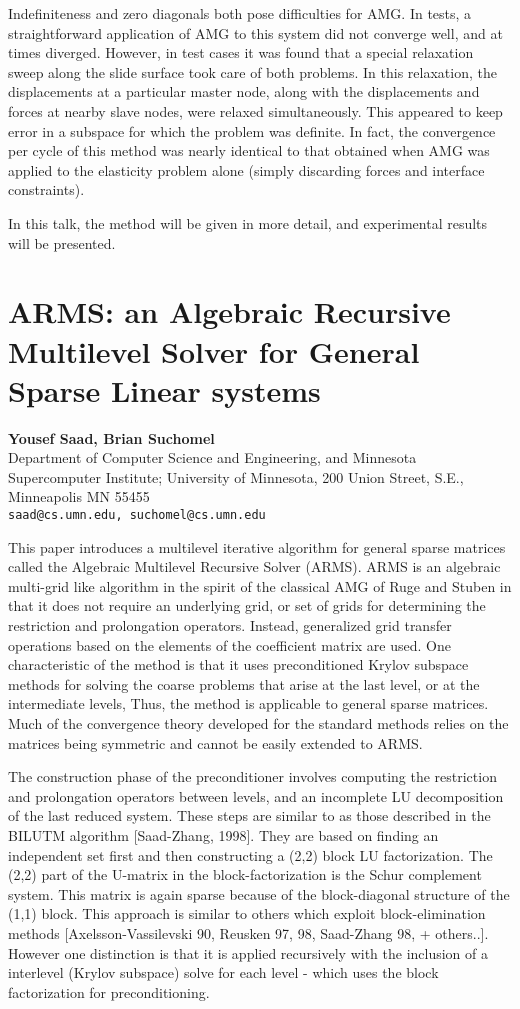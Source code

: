 \documentclass[11pt]{article}
\newcommand{\nextab}[4]{
	\section{#2}
	{\bf #1} \\ \nopagebreak
	{#3} \\ \nopagebreak
	{\tt #4} \nopagebreak
	}
\begin{document}
Indefiniteness and zero diagonals both pose difficulties for AMG. In
tests, a straightforward application of AMG to this system did not
converge well, and at times diverged.  However, in test cases it was
found that a special relaxation sweep along the slide surface took care
of both problems. In this relaxation, the displacements at a particular
master node, along with the displacements and forces at nearby slave
nodes, were relaxed simultaneously. This appeared to keep error in a
subspace for which the problem was definite. In fact, the convergence
per cycle of this method was nearly identical to that obtained when AMG
was applied to the elasticity problem alone (simply discarding forces
and interface constraints).

In this talk, the method will be given in more detail, and experimental
results will be presented.




\nextab{Yousef Saad, Brian Suchomel}
	{ARMS: an Algebraic Recursive Multilevel Solver for
	General Sparse Linear systems}
	{Department of Computer Science and Engineering,
		and Minnesota Supercomputer Institute;
		University of Minnesota,
		200 Union Street, S.E.,
		Minneapolis MN 55455}
	{saad@cs.umn.edu, suchomel@cs.umn.edu}

This paper introduces  a multilevel  iterative algorithm  for  general
sparse matrices called   the  Algebraic Multilevel  Recursive   Solver
(ARMS).  ARMS is an algebraic multi-grid  like algorithm in the spirit
of the classical  AMG of Ruge  and Stuben in  that it does  not
require   an  underlying grid, or   set  of grids  for determining the
restriction and   prolongation operators.  Instead,  generalized  grid
transfer  operations based on the elements  of  the coefficient matrix
are  used.     One characteristic of   the  method   is that   it uses
preconditioned Krylov subspace methods for solving the coarse problems
that arise at the last level, or at the intermediate levels, Thus, the
method   is  applicable  to  general  sparse   matrices.   Much of the
convergence  theory developed for the   standard methods relies on the
matrices being symmetric and cannot be easily extended to ARMS.

The construction  phase of  the preconditioner involves  computing the
restriction   and  prolongation  operators   between   levels,  and an
incomplete LU  decomposition of the last  reduced system.  These steps
are similar to as those described in the BILUTM algorithm [Saad-Zhang,
1998].  They  are based on finding  an independent set  first and then
constructing a (2,2) block LU factorization. The (2,2) part of the
U-matrix in the block-factorization is the Schur complement system.
This matrix is again sparse because of the block-diagonal
structure of the (1,1) block. This approach is similar to others
which exploit block-elimination methods [Axelsson-Vassilevski 90,
Reusken 97, 98, Saad-Zhang 98, + others..]. However one distinction
is that it is applied recursively with the inclusion of a
interlevel (Krylov subspace) solve for each level - which
uses the block factorization for preconditioning.
\end{document}
